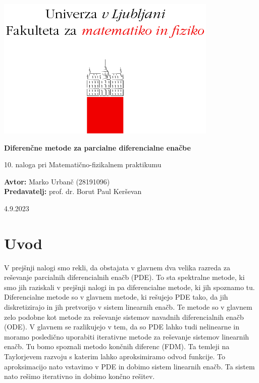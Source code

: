 \documentclass[a4paper]{article}
\begin{document}
\begin{titlepage}
    \begin{center}
        \includegraphics[]{logo.png}
        \vspace*{3cm}
        
        \Huge
        \textbf{Diferenčne metode za parcialne diferencialne enačbe}
        
        \vspace{0.5cm}
        \large
        10. naloga pri Matematično-fizikalnem praktikumu

        \vspace{4.5cm}
        
        \textbf{Avtor:} Marko Urbanč (28191096)\ \\
        \textbf{Predavatelj:} prof. dr. Borut Paul Kerševan\ \\
        
        \vspace{2.8cm}
        
        \large
        4.9.2023
    \end{center}
\end{titlepage}
\tableofcontents
\newpage
\section{Uvod}
V prejšnji nalogi smo rekli, da obstajata v glavnem dva velika razreda za reševanje parcialnih diferencialnih
enačb (PDE). To sta spektralne metode, ki smo jih raziskali v prejšnji nalogi in pa diferencialne metode, ki jih
spoznamo tu. Diferencialne metode so v glavnem metode, ki rešujejo PDE tako, da jih diskretizirajo in jih
pretvorijo v sistem linearnih enačb. Te metode so v glavnem zelo podobne kot metode za reševanje sistemov
navadnih diferencialnih enačb (ODE). V glavnem se razlikujejo v tem, da so PDE lahko tudi nelinearne in
moramo posledično uporabiti iterativne metode za reševanje sistemov linearnih enačb. Tu bomo spoznali 
metodo končnih diferenc (FDM). Ta temleji na Taylorjevem razvoju s katerim lahko aproksimiramo odvod
funkcije. To aproksimacijo nato vstavimo v PDE in dobimo sistem linearnih enačb. Ta sistem nato rešimo
iterativno in dobimo končno rešitev. \\
\end{document}
